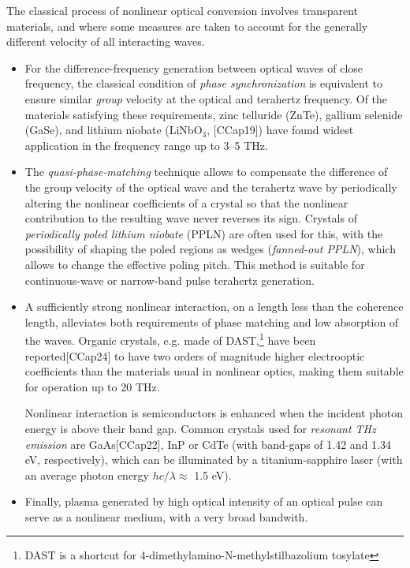 The classical process of nonlinear optical conversion involves transparent materials, and where some measures are taken to account for the generally different velocity of all interacting waves.
\begin{itemize}
\item{For the difference-frequency generation between optical waves of close frequency, the classical condition of \textit{phase synchronization} is equivalent to ensure similar \textit{group} velocity at the optical and terahertz frequency. Of the materials satisfying these requirements, zinc telluride (ZnTe), gallium selenide (GaSe), and lithium niobate (LiNbO$_{3}$, [CCap19]) have found widest application in the frequency range up to 3--5 THz. } 
\item{The \textit{quasi-phase-matching} technique allows to compensate the difference of the group velocity of the optical wave and the terahertz wave by periodically altering the nonlinear coefficients of a crystal so that the nonlinear contribution to the resulting wave never reverses its sign. Crystals of \textit{periodically poled lithium niobate} (PPLN) are often used for this, with the possibility of shaping the poled regions as wedges (\textit{fanned-out PPLN}), which allows to change the effective poling pitch. This method is suitable for continuous-wave or narrow-band pulse terahertz generation.  }  %
\item{A sufficiently strong nonlinear interaction, on a length less than the coherence length, alleviates both requirements of phase matching and low absorption of the waves.\cite{leitenstorfer1999detectors} Organic crystals, e.g. made of DAST,\footnote{DAST is a shortcut for 4-dimethylamino-N-methylstilbazolium tosylate}
have been reported\cite{han2000use}[CCap24]
to have two orders of magnitude higher electrooptic coefficients than the materials usual in nonlinear optics, making them suitable for operation up to 20 THz. 

Nonlinear interaction is semiconductors is enhanced when the incident photon energy is above their band gap. Common crystals used for \textit{resonant THz emission} are GaAs[CCap22],
 InP  or CdTe
(with band-gaps of 1.42 and 1.34 eV, %
 respectively), which can be illuminated by a
 titanium-sapphire laser (with an average photon energy $hc/\lambda \approx$ 1.5 eV).
 } 
\item{Finally, plasma generated by high optical intensity of an optical pulse can serve as a nonlinear medium, with a very broad bandwith. \cite{tong2012} }
 \end{itemize}

